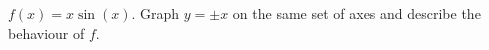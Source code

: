 {$f(x) = x \sin(x)$.  Graph $y = \pm x$ on the same set of axes and describe the behaviour of $f$. }
{}
